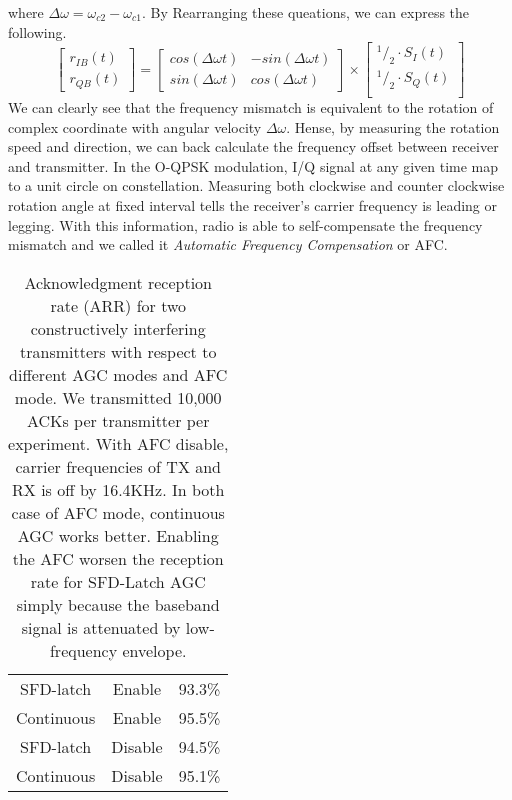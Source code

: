 where $\Delta\omega = \omega_{c2} - \omega_{c1}$. By Rearranging these queations, we can express the
following.
\[
\begin{bmatrix}
	r_{IB}(t) \\
	r_{QB}(t) 
\end{bmatrix}
=
\begin{bmatrix}
	cos(\Delta\omega t) & -sin(\Delta\omega t) \\
	sin(\Delta\omega t) & cos(\Delta\omega t)
\end{bmatrix}
\times
\begin{bmatrix}
	{}^1/_2\cdot S_I(t)\\
	{}^1/_2\cdot S_Q(t)\\
\end{bmatrix}
\]
We can clearly see that the frequency mismatch is equivalent to the rotation 
of complex coordinate with angular velocity $\Delta\omega$. Hense, by 
measuring the rotation speed and direction, we can back calculate the 
frequency offset between receiver and transmitter. In the O-QPSK modulation, 
I/Q signal at any given time map to a unit circle on constellation. 
Measuring both clockwise and counter clockwise rotation angle at fixed 
interval tells the receiver's carrier frequency is leading or legging. 
With this information, radio is able to self-compensate the frequency 
mismatch and we called it \textit{Automatic Frequency Compensation} or AFC. 

\begin{table}
	\centering
	\begin{tabular}{|c|c|c|} \hline
		\rowcolor[gray]{0}
		  {\sc {\color{white} AGC mode}}
		& {\sc {\color{white} AFC mode}}
		& {\sc {\color{white} ARR}}
		\\ \hline
		SFD-latch 	& Enable 	& 93.3\%	\\ \hline
		Continuous	& Enable	& 95.5\%	\\ \hline
		SFD-latch 	& Disable	& 94.5\%	\\ \hline
		Continuous	& Disable	& 95.1\%	\\ \hline
	\end{tabular}
    \caption{Acknowledgment reception rate (ARR) for two constructively
interfering transmitters with respect to different AGC modes and AFC mode. 
We transmitted 10,000 ACKs per transmitter per experiment. With AFC disable,
carrier frequencies of TX and RX is off by 16.4KHz. In both case of AFC mode,
continuous AGC works better. Enabling the AFC worsen the reception rate for
SFD-Latch AGC simply because the baseband signal is attenuated by low-frequency
envelope.}
	\label{tab:ARR_versus_agc_afc_mode}
\end{table}

